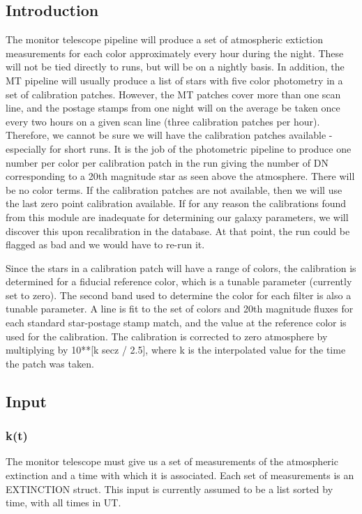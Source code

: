 
\subsection{Introduction}

The monitor telescope pipeline will produce a set of atmospheric
extiction measurements for each color approximately every hour during
the night.  These will not be tied directly to runs, but will be on a
nightly basis.  In addition, the MT pipeline will usually produce a
list of stars with five color photometry in a set of calibration
patches.  However, the MT patches cover more than one scan line, and
the postage stamps from one night will on the average be taken once
every two hours on a given scan line (three calibration patches per
hour).  Therefore, we cannot be sure we will have the calibration
patches available - especially for short runs.  It is the job of the
photometric pipeline to produce one number per color per calibration
patch in the run giving the number of DN corresponding to a 20th
magnitude star as seen above the atmosphere.  There will be no
color terms.  If the calibration patches are not available, then we
will use the last zero point calibration available.  If for any reason
the calibrations found from this module are inadequate for determining
our galaxy parameters, we will discover this upon recalibration in the
database.  At that point, the run could be flagged as bad and we would
have to re-run it.

Since the stars in a calibration patch will have a range of colors,
the calibration is determined for a fiducial reference color, which is
a tunable parameter (currently set to zero). The second band used to
determine the color for each filter is also a tunable parameter.  A
line is fit to the set of colors and 20th magnitude fluxes for each
standard star-postage stamp match, and the value at the reference
color is used for the calibration.  The calibration is corrected to
zero atmosphere by multiplying by 10**[k secz / 2.5], where k is the
interpolated value for the time the patch was taken.

\subsection{Input}

\subsubsection{k(t)}

The monitor telescope must give us a set of measurements of the atmospheric
extinction and a time with which it is associated.  Each set of
measurements is an EXTINCTION struct.  This input is currently assumed to be
a list sorted by time, with all times in UT.

